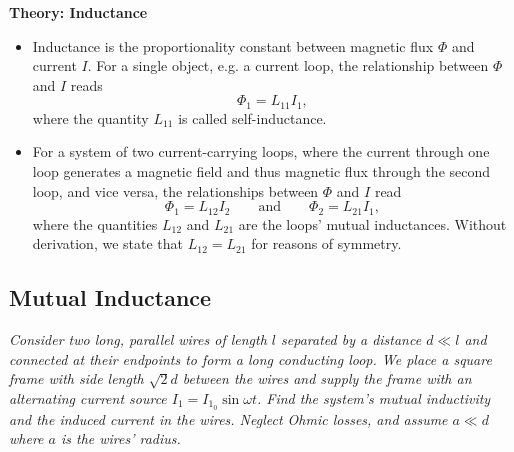 \documentclass[11pt, a4paper]{article}
\newcommand{\eqtext}[1]{\qquad \text{#1} \qquad}
\begin{document}
\textbf{Theory: Inductance}
\begin{itemize}
	\item Inductance is the proportionality constant between magnetic flux $ \Phi $ and current $ I $. For a single object, e.g. a current loop, the relationship between $ \Phi $ and $ I $ reads
	\begin{equation*}
		\Phi_{1} = L_{11} I_{1},
	\end{equation*}
	where the quantity $ L_{11} $ is called self-inductance. 
	
	\item For a system of two current-carrying loops, where the current through one loop generates a magnetic field and thus magnetic flux through the second loop, and vice versa, the relationships between $ \Phi $ and $ I $ read
	\begin{equation*}
		\Phi_{1} = L_{12}I_{2} \eqtext{and}  \Phi_{2} = L_{21}I_{1},
	\end{equation*}
	where the quantities $ L_{12} $ and $ L_{21} $ are the loops' mutual inductances. Without derivation, we state that $ L_{12} = L_{21} $ for reasons of symmetry.
	
\end{itemize}





\subsection{Mutual Inductance}


\textit{Consider two long, parallel wires of length $ l $ separated by a distance $ d \ll l $ and connected at their endpoints to form a long conducting loop. We place a square frame with side length $ \sqrt{2}d $ between the wires and supply the frame with an alternating current source $ I_{1} = I_{1_{0}}\sin \omega t $. Find the system's mutual inductivity and the induced current in the wires. Neglect Ohmic losses, and assume $ a \ll d $ where $ a $ is the wires' radius.}
\end{document}
